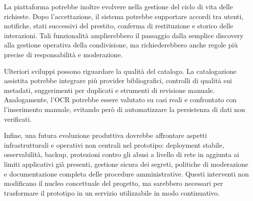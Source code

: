La piattaforma potrebbe inoltre evolvere nella gestione del ciclo di vita delle richieste. Dopo l'accettazione, il sistema potrebbe supportare accordi tra utenti, notifiche, stati successivi del prestito, conferma di restituzione e storico delle interazioni. Tali funzionalità amplierebbero il passaggio dalla semplice discovery alla gestione operativa della condivisione, ma richiederebbero anche regole più precise di responsabilità e moderazione.

Ulteriori sviluppi possono riguardare la qualità del catalogo. La catalogazione assistita potrebbe integrare più provider bibliografici, controlli di qualità sui metadati, suggerimenti per duplicati e strumenti di revisione manuale. Analogamente, l'OCR potrebbe essere valutato su casi reali e confrontato con l'inserimento manuale, evitando però di automatizzare la persistenza di dati non verificati.

Infine, una futura evoluzione produttiva dovrebbe affrontare aspetti infrastrutturali e operativi non centrali nel prototipo: deployment stabile, osservabilità, backup, protezioni contro gli abusi a livello di rete in aggiunta ai limiti applicativi già presenti, gestione sicura dei segreti, politiche di moderazione e documentazione completa delle procedure amministrative. Questi interventi non modificano il nucleo concettuale del progetto, ma sarebbero necessari per trasformare il prototipo in un servizio utilizzabile in modo continuativo.
